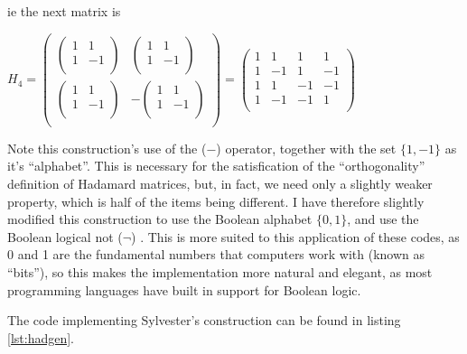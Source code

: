 \documentclass[a4paper,11pt]{article}
\begin{document}
    ie the next matrix is

    \begin{math}
    H_4 =
    \begin{pmatrix}
    \begin{pmatrix}
    1 &  1 \\
    1 & -1 \\
    \end{pmatrix} &
    \begin{pmatrix}
    1 &  1 \\
    1 & -1 \\
    \end{pmatrix} \\
    \begin{pmatrix}
    1 &  1 \\
    1 & -1 \\
    \end{pmatrix} &
    -\begin{pmatrix}
    1 &  1 \\
    1 & -1 \\
    \end{pmatrix} \\
    \end{pmatrix} =
    \begin{pmatrix}
    1 &  1 &  1 &  1 \\
    1 & - 1 &  1 & - 1 \\
    1 &  1 & - 1 & - 1 \\
    1 & - 1 & - 1 &  1 \\
    \end{pmatrix}
    \end{math}

    Note this construction's use of the ($-$) operator, together with the set
    $\{1,-1\}$ as it's ``alphabet''. This is necessary for the satisfication of
    the ``orthogonality'' definition of Hadamard matrices, but, in fact, we need
    only a slightly weaker property, which is half of the items being different.
    I have therefore slightly modified this construction to use the Boolean
    alphabet $\{0,1\}$, and use the Boolean logical not ($\lnot$)
    \cite{BooleRecords1956Kneale}. This is more suited to this application of
    these codes, as 0 and 1 are the fundamental numbers that computers work with
    (known as ``bits''), so this makes the implementation more natural and
    elegant, as most programming languages have built in support for Boolean
    logic.

    The code implementing Sylvester's construction can be found in listing
    \ref{lst:hadgen}.
\end{document}
